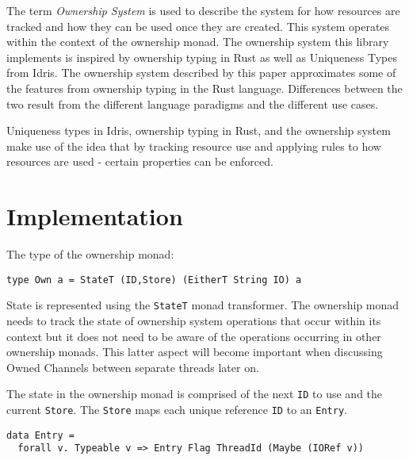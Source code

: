 \documentclass[onehalf,11pt]{beavtex}
\begin{document}
The term \textit{Ownership System} is used to describe the system for how
resources are tracked and how they can be used once they are created. This
system operates within the context of the ownership monad.
The ownership system this library implements is inspired by
ownership typing in Rust as well as Uniqueness Types
from Idris.\cite{rust_book_ownership} \cite{idris_uniqueness_types}
The ownership system described by this paper approximates some of the
features from ownership typing in the Rust language. Differences between
the two result from the different language paradigms and the different use
cases.

Uniqueness types in Idris, ownership typing in Rust, and the ownership system
make use of the idea that by tracking resource use and applying rules to how
resources are used - certain properties can be enforced.

\section{Implementation}

The type of the ownership monad:

\begin{verbatim}
type Own a = StateT (ID,Store) (EitherT String IO) a
\end{verbatim}


State is represented using the \texttt{StateT} monad transformer.
The ownership monad needs to track the state of ownership system operations
that occur within its context but it does not need to be aware of the
operations occurring in other ownership monads.
This latter aspect will become important when discussing Owned Channels between
separate threads later on.

The state in the ownership monad is comprised of the next \texttt{ID}
to use and the current \texttt{Store}.  The \texttt{Store} maps each unique
reference \texttt{ID} to an \texttt{Entry}.

\begin{verbatim}
data Entry =
  forall v. Typeable v => Entry Flag ThreadId (Maybe (IORef v))
\end{verbatim}
\end{document}
